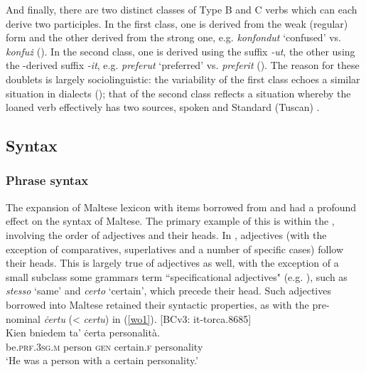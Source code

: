 \documentclass[output=paper]{langsci/langscibook}
\begin{document}
And finally, there are two distinct classes of Type B and C verbs which can each derive two  participles. In the first class, one  is derived from the weak (regular) form  and the other derived from the strong one, e.g. \textit{konfondut} `confused' vs. \textit{konfuż} (\citealt[134]{mifsudloanverbs}). In the second class, one  is derived using the  suffix \textit{-ut}, the other using the -derived suffix \textit{-it}, e.g. \textit{preferut} `preferred' vs. \textit{preferit} (\citealt[230]{mifsudloanverbs}). The reason for these doublets is largely sociolinguistic: the variability of the first class echoes a similar situation in  dialects (\citealt[134]{mifsudloanverbs}); that of the second class reflects a situation whereby the loaned verb effectively has two sources, spoken  and  Standard (Tuscan) .
\subsection{Syntax}
\subsubsection{Phrase syntax}
 \label{wo} %
The expansion of Maltese lexicon with items borrowed from  and  had a profound effect on the syntax of Maltese. The primary example of this is  within the , involving the order of adjectives and their heads. In , adjectives (with the exception of comparatives, superlatives and a number of specific cases) follow their heads. This is largely true of  adjectives as well, with the exception of a small subclass some grammars term ``specificational adjectives" (e.g. \citealt[55--56]{italian2007}), such as \textit{stesso} `same' and \textit{certo} `certain', which precede their head. Such adjectives borrowed into Maltese retained their syntactic properties, as with the pre-nominal \textit{ċertu} (<  \textit{certu}) in (\ref{wo1}).
\ea\label{wo1}
{[BCv3: it-torca.8685]} \\
	\gll Kien bniedem ta' ċerta personalità. \\
	be.\textsc{prf.3sg.m} person \textsc{gen} certain.\textsc{f} personality\\
	\glt `He was a person with a certain personality.'\\
\z
\end{document}
